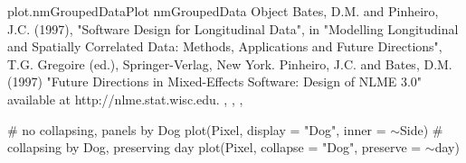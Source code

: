 \documentclass[pdftex]{article} \usepackage{url,graphicx}
\renewcommand{\Twiddle}{\mbox{\(\sim\)}}
\begin{document}
\begin{Helpfile}{plot.nmGroupedData}{Plot nmGroupedData Object}
Bates, D.M. and Pinheiro, J.C. (1997), "Software Design for Longitudinal
Data", in "Modelling Longitudinal and Spatially Correlated Data:
Methods, Applications and Future Directions", T.G. Gregoire (ed.),
Springer-Verlag, New York.
Pinheiro, J.C. and Bates, D.M. (1997) "Future Directions in
Mixed-Effects Software: Design of NLME 3.0" available at
http://nlme.stat.wisc.edu.
, ,
, 
\need 15pt
\vspace{-16pt} 
\begin{Example}
# no collapsing, panels by Dog
plot(Pixel, display = "Dog", inner = \Twiddle Side)
# collapsing by Dog, preserving day
plot(Pixel, collapse = "Dog", preserve = \Twiddle day)
\end{Example}
\end{Helpfile}
\end{document}
